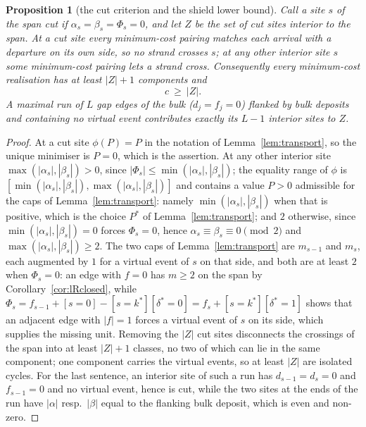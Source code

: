 \documentclass[11pt]{article}
\theoremstyle{plain}
\newtheorem{proposition}[theorem]{Proposition}
\theoremstyle{definition}
\theoremstyle{remark}
\begin{document}
\begin{proposition}[the cut criterion and the shield lower bound]\label{prop:cut}
Call a site $s$ of the span \emph{cut} if $\alpha_s=\beta_s=\Phi_s=0$, and let $Z$ be the set of
cut sites interior to the span. At a cut site every minimum-cost pairing matches each arrival with a
departure on its own side, so no strand crosses $s$; at any other interior site $s$ some
minimum-cost pairing lets a strand cross. Consequently every minimum-cost realisation has at least
$|Z|+1$ components and
\[
   c\ \ge\ |Z| .
\]
A maximal run of $L$ gap edges of the bulk \textup{(}$d_j=f_j=0$\textup{)} flanked by bulk deposits
and containing no virtual event contributes exactly its $L-1$ interior sites to $Z$.
\end{proposition}

\begin{proof}
At a cut site $\phi(P)=P$ in the notation of Lemma~\ref{lem:transport}, so the unique minimiser is
$P=0$, which is the assertion. At any other interior site $\max(|\alpha_s|,|\beta_s|)>0$, since
$|\Phi_s|\le\min(|\alpha_s|,|\beta_s|)$; the equality range of $\phi$ is
$[\min(|\alpha_s|,|\beta_s|),\max(|\alpha_s|,|\beta_s|)]$ and contains a value $P>0$ admissible for
the caps of Lemma~\ref{lem:transport}: namely $\min(|\alpha_s|,|\beta_s|)$ when that is positive,
which is the choice $P^\ast$ of Lemma~\ref{lem:transport}; and $2$ otherwise, since
$\min(|\alpha_s|,|\beta_s|)=0$ forces $\Phi_s=0$, hence $\alpha_s\equiv\beta_s\equiv0\pmod2$ and
$\max(|\alpha_s|,|\beta_s|)\ge2$. The two caps of Lemma~\ref{lem:transport} are $m_{s-1}$ and $m_s$,
each augmented by $1$ for a virtual event of $s$ on that side, and both are at least $2$ when
$\Phi_s=0$: an edge with $f=0$ has $m\ge2$ on the span by Corollary~\ref{cor:lRclosed}, while
$\Phi_s=f_{s-1}+[s=0]-[s=k^\ast][\delta^\ast=0]=f_s+[s=k^\ast][\delta^\ast=1]$ shows that an adjacent
edge with $|f|=1$ forces a virtual event of $s$ on its side, which supplies the missing unit. Removing the $|Z|$ cut sites disconnects the crossings of the span
into at least $|Z|+1$ classes, no two of which can lie in the same component; one component carries
the virtual events, so at least $|Z|$ are isolated cycles. For the last sentence, an interior site
of such a run has $d_{s-1}=d_s=0$ and $f_{s-1}=0$ and no virtual event, hence is cut, while the two
sites at the ends of the run have $|\alpha|$ resp.\ $|\beta|$ equal to the flanking bulk deposit,
which is even and non-zero.
\end{proof}
\end{document}
